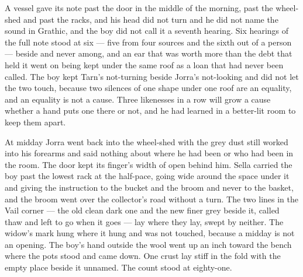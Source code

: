 A vessel gave its note past the door in the middle of the morning, past the wheel-shed and past the racks, and his head did not turn and he did not name the sound in Grathic, and the boy did not call it a seventh hearing. Six hearings of the full note stood at six --- five from four sources and the sixth out of a person --- beside and never among, and an ear that was worth more than the debt that held it went on being kept under the same roof as a loan that had never been called. The boy kept Tarn's not-turning beside Jorra's not-looking and did not let the two touch, because two silences of one shape under one roof are an equality, and an equality is not a cause. Three likenesses in a row will grow a cause whether a hand puts one there or not, and he had learned in a better-lit room to keep them apart.

At midday Jorra went back into the wheel-shed with the grey dust still worked into his forearms and said nothing about where he had been or who had been in the room. The door kept its finger's width of open behind him. Sella carried the boy past the lowest rack at the half-pace, going wide around the space under it and giving the instruction to the bucket and the broom and never to the basket, and the broom went over the collector's road without a turn. The two lines in the Vail corner --- the old clean dark one and the new finer grey beside it, called thaw and left to go when it goes --- lay where they lay, swept by neither. The widow's mark hung where it hung and was not touched, because a midday is not an opening. The boy's hand outside the wool went up an inch toward the bench where the pots stood and came down. One crust lay stiff in the fold with the empty place beside it unnamed. The count stood at eighty-one.
